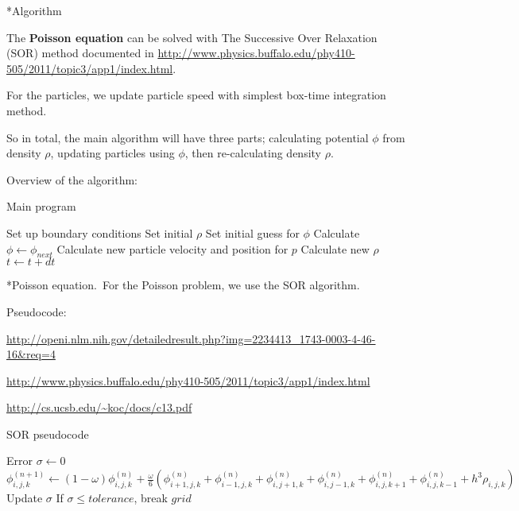 \documentclass[titlepage, 11pt]{article}
\makeatletter
\renewcommand{\subsection}{\@startsection
        {subsection}
        {2}
        {0mm}
        {.8\baselineskip}
        {.5\baselineskip}
        {\bfseries\normalsize}}
\renewcommand{\subsubsection}{\@startsection
        {subsubsection}
        {2}
        {0mm}
        {.5\baselineskip}
        {0mm}
        {\it\bfseries\normalsize}}
\makeatother
\begin{document}
\subsection*{Algorithm}

The \textbf{Poisson equation} can be solved with The Successive Over Relaxation (SOR) 
method documented in \url{http://www.physics.buffalo.edu/phy410-505/2011/topic3/app1/index.html}. 

For the particles, we update particle speed with simplest box-time integration method.

So in total, the main algorithm will have three parts; calculating potential $\phi$ 
from density $\rho$, updating particles using $\phi$, then re-calculating density 
$\rho$.

Overview of the algorithm:

\begin{algorithm}
 \label{alg:main}
 \caption{Main program}
 \begin{algorithmic}
  \State Set up boundary conditions
  \State Set initial $\rho$
  \State Set initial guess for $\phi$
  \Loop
   \State Calculate $\phi \gets \phi_{next}$
    \State Calculate new particle velocity and position for $p$
   \EndFor
   \State Calculate new $\rho$
   \State $t \gets t+dt$
  \EndLoop
 \end{algorithmic}

\end{algorithm}


\subsubsection*{Poisson equation.}\ For the Poisson problem, we use the SOR algorithm.

Pseudocode: 

\url{http://openi.nlm.nih.gov/detailedresult.php?img=2234413_1743-0003-4-46-16&req=4}

\url{http://www.physics.buffalo.edu/phy410-505/2011/topic3/app1/index.html}

\url{http://cs.ucsb.edu/~koc/docs/c13.pdf}

\begin{algorithm}
 \label{pseudo:SOR}
 \caption{SOR pseudocode}
\begin{algorithmic}[1]
   \State Error $\sigma \gets 0$
    \State $\phi_{i,j,k}^{(n+1)} \gets (1-\omega)\phi_{i,j,k}^{(n)} + \frac{\omega}{6} (\phi_{i+1,j,k}^{(n)} + \phi_{i-1,j,k}^{(n)} + \phi_{i,j+1,k}^{(n)} + \phi_{i,j-1,k}^{(n)} + \phi_{i,j,k+1}^{(n)} + \phi_{i,j,k-1}^{(n)} + h^3\rho_{i,j,k})$
    \State Update $\sigma$
   \EndFor
   \State If $\sigma \leq tolerance$, break
  \EndFor
  \State \Return $grid$
 \EndFunction
\end{algorithmic}
\end{algorithm}
\end{document}
